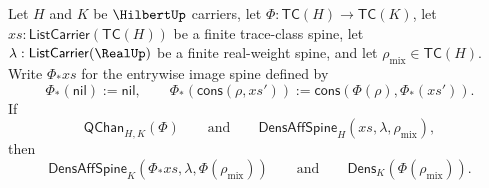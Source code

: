 \begin{theorem}
\label{thm:quantumchannel-density-finite-mixture-preservation}
Let $H$ and $K$ be $\HilbertUp$ carriers, let $\Phi:\mathsf{TC}(H)\to\mathsf{TC}(K)$, let $xs:\mathsf{ListCarrier}(\mathsf{TC}(H))$ be a finite trace-class spine, let $\lambda:\mathsf{ListCarrier}(\RealUp)$ be a finite real-weight spine, and let $\rho_{\mathrm{mix}}\in\mathsf{TC}(H)$. Write $\Phi_{\ast}xs$ for the entrywise image spine defined by
$$
\Phi_{\ast}(\mathsf{nil}) := \mathsf{nil},
\qquad
\Phi_{\ast}(\mathsf{cons}(\rho,xs')) :=
\mathsf{cons}(\Phi(\rho),\Phi_{\ast}(xs')).
$$
If
$$
\mathsf{QChan}_{H,K}(\Phi)
\qquad\text{and}\qquad
\mathsf{DensAffSpine}_H(xs,\lambda,\rho_{\mathrm{mix}}),
$$
then
$$
\mathsf{DensAffSpine}_K(\Phi_{\ast}xs,\lambda,\Phi(\rho_{\mathrm{mix}}))
\qquad\text{and}\qquad
\mathsf{Dens}_K(\Phi(\rho_{\mathrm{mix}})).
$$
\end{theorem}
